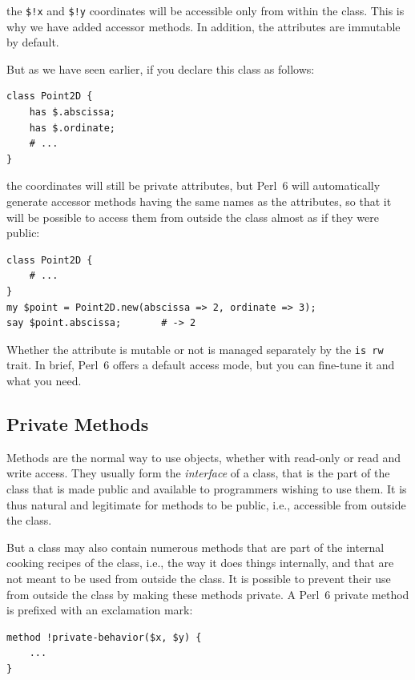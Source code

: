 the \verb'$!x' and \verb'$!y' coordinates will be 
accessible only from within the class. This is why 
we have added accessor methods. In addition, the 
attributes are immutable by default.

But as we have seen earlier, if you declare this class 
as follows:

\begin{verbatim}
class Point2D {
    has $.abscissa;
    has $.ordinate;
    # ...
}
\end{verbatim}

the coordinates will still be private attributes, but Perl~6 
will automatically generate accessor methods having the same 
names as the attributes, so that it will be possible to access 
them from outside the class almost as if they were public:

\begin{verbatim}
class Point2D {
    # ...
}
my $point = Point2D.new(abscissa => 2, ordinate => 3);
say $point.abscissa;       # -> 2
\end{verbatim}

Whether the attribute is mutable or not is managed separately 
by the {\tt is rw} trait. In brief, Perl~6 offers a default 
access mode, but you can fine-tune it and what you need.


\subsection{Private Methods}

Methods are the normal way to use objects, whether with read-only 
or read and write access. They usually form the \emph{interface} 
of a class, that is the part of the class that is made public 
and available to programmers wishing to use them. It is thus 
natural and legitimate for methods to be public, i.e., accessible 
from outside the class.

But a class may also contain numerous methods that are part 
of the internal cooking recipes of the class, i.e., the way it does 
things internally, and that are not 
meant to be used from outside the class. It is possible to prevent 
their use from outside the class by making these methods private. 
A Perl~6 private method is prefixed with an exclamation mark:

\begin{verbatim}
method !private-behavior($x, $y) {
    ...
}
\end{verbatim}

